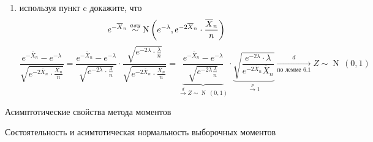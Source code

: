 \documentclass[a4paper,11pt]{article}
\begin{document}
{\begin{enumerate}
        Тогда по теореме 6.1
        \[e^{-\overline{X}_n} = g\left(\widehat{\theta}_n\right) \asi \operatorname{N}\left(g(\theta) = e^{-\lambda}, \left(g'(\theta)\right)^2 \cdot \frac{\sigma^2(\theta)}{n} = e^{-2\lambda} \cdot \frac{\lambda}{n}\right)\]
        \item[d)] используя пункт c докажите, что
        \[e^{-\overline{X}_n} \overset{asy}{\sim} \operatorname{N}\left(e^{-\lambda}, e^{-2\overline{X}_n} \cdot \frac{\overline{X}_n}{n}\right)\]
        \[\frac{e^{-\overline{X}_n} - e^{-\lambda}}{\sqrt{e^{-2\overline{X}_n} \cdot \frac{\overline{X}_n}{n}}} = \frac{e^{-\overline{X}_n} - e^{-\lambda}}{\sqrt{e^{-2\lambda}\cdot\frac{\lambda}{n}}} \cdot \frac{\sqrt{e^{-2\lambda}\cdot\frac{\lambda}{n}}}{\sqrt{e^{-2\overline{X}_n}\cdot\frac{\overline{X}_n}{n}}} = \underbrace{\frac{e^{-\overline{X}_n} - e^{-\lambda}}{\sqrt{e^{-2\lambda}\frac{\lambda}{n}}}}_{\xrightarrow{d} Z \sim \operatorname{N}\,(0, 1)} \cdot \underbrace{\sqrt{\frac{e^{-2\lambda}\cdot\lambda}{e^{-2\overline{X}_n}\overline{X}_n}}}_{\xrightarrow{P} 1} \xrightarrow[\text{по лемме 6.1}]{d} Z \sim \operatorname{N}\,(0,1)\]

    \end{enumerate}
}
\setcounter{maindf}{7}
\setcounter{subdf}{0}

\setcounter{mainth}{7}
\setcounter{subth}{0}

\setcounter{mainpr}{7}
\setcounter{subpr}{0}

\setcounter{mainex}{7}
\setcounter{subex}{0}

\setcounter{mainta}{7}
\setcounter{subta}{0}

\setcounter{mainle}{7}
\setcounter{suble}{0}
\newpage
\begin{center}
    \huge Асимптотические свойства метода моментов
\end{center}
\begin{center}
    Состоятельность и асимтотическая нормальность выборочных моментов
\end{center}
\end{document}
